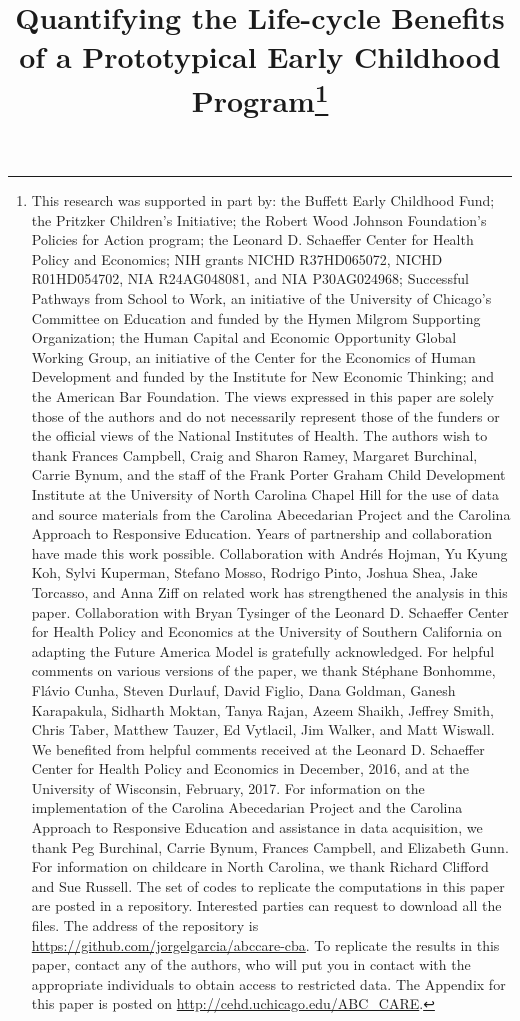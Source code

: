 \begin{titlepage}
\title{\Large \textbf{Quantifying the Life-cycle Benefits \\ of a Prototypical Early Childhood Program}\thanks{This research was supported in part by: the Buffett Early Childhood Fund; the Pritzker Children's Initiative; the Robert Wood Johnson Foundation's Policies for Action program; the Leonard D. Schaeffer Center for Health Policy and Economics; NIH grants NICHD R37HD065072, NICHD R01HD054702, NIA R24AG048081, and NIA P30AG024968; Successful Pathways from School to Work, an initiative of the University of Chicago's Committee on Education and funded by the Hymen Milgrom Supporting Organization; the Human Capital and Economic Opportunity Global Working Group, an initiative of the Center for the Economics of Human Development and funded by the Institute for New Economic Thinking; and the American Bar Foundation. The views expressed in this paper are solely those of the authors and do not necessarily represent those of the funders or the official views of the National Institutes of Health. The authors wish to thank Frances Campbell, Craig and Sharon Ramey, Margaret Burchinal, Carrie Bynum, and the staff of the Frank Porter Graham Child Development Institute at the University of North Carolina Chapel Hill for the use of data and source materials from the Carolina Abecedarian Project and the Carolina Approach to Responsive Education. Years of partnership and collaboration have made this work possible. Collaboration with Andr\'{e}s Hojman, Yu Kyung Koh, Sylvi Kuperman, Stefano Mosso, Rodrigo Pinto, Joshua Shea, Jake Torcasso, and Anna Ziff on related work has strengthened the analysis in this paper. Collaboration with Bryan Tysinger of the Leonard D. Schaeffer Center for Health Policy and Economics at the University of Southern California on adapting the Future America Model is gratefully acknowledged. For helpful comments on various versions of the paper, we thank St\'{e}phane Bonhomme, Fl\'{a}vio Cunha, Steven Durlauf, David Figlio, Dana Goldman, Ganesh Karapakula, Sidharth Moktan, Tanya Rajan, Azeem Shaikh, Jeffrey Smith, Chris Taber, Matthew Tauzer, Ed Vytlacil, Jim Walker, and Matt Wiswall. We benefited from helpful comments received at the Leonard D. Schaeffer Center for Health Policy and Economics in December, 2016, and at the University of Wisconsin, February, 2017. For information on the implementation of the Carolina Abecedarian Project and the Carolina Approach to Responsive Education and assistance in data acquisition, we thank Peg Burchinal, Carrie Bynum, Frances Campbell, and Elizabeth Gunn. For information on childcare in North Carolina, we thank Richard Clifford and Sue Russell. The set of codes to replicate the computations in this paper are posted in a repository. Interested parties can request to download all the files. The address of the repository is \url{https://github.com/jorgelgarcia/abccare-cba}. To replicate the results in this paper, contact any of the authors, who will put you in contact with the appropriate individuals to obtain access to restricted data. The Appendix for this paper is posted on \url{http://cehd.uchicago.edu/ABC_CARE}.}}


\end{titlepage}
